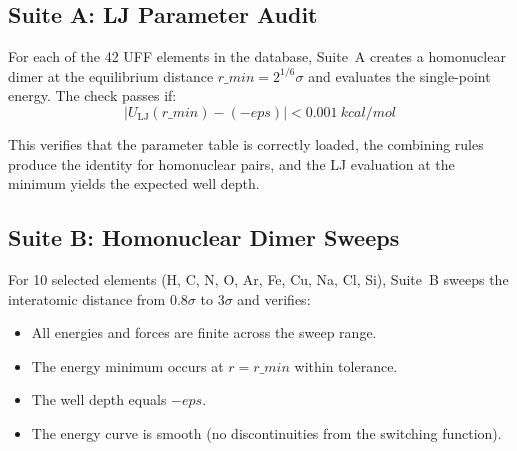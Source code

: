 \documentclass[11pt,twoside]{article}
\def\varepsilon{eps}%
\def\kcalmol{kcal/mol}%
\def\rmin{r\_min}%
\newcommand{\kcalmol}{\text{kcal/mol}}
\newcommand{\rmin}{r_{\mathrm{min}}}
\begin{document}
\subsection{Suite A: LJ Parameter Audit}

For each of the 42 UFF elements in the database, Suite~A creates a homonuclear dimer at the equilibrium distance $\rmin = 2^{1/6}\sigma$ and evaluates the single-point energy. The check passes if:
\begin{equation}
  |U_{\mathrm{LJ}}(\rmin) - (-\varepsilon)| < 0.001~\kcalmol
  \label{eq:suiteA}
\end{equation}

This verifies that the parameter table is correctly loaded, the combining rules produce the identity for homonuclear pairs, and the LJ evaluation at the minimum yields the expected well depth.

\subsection{Suite B: Homonuclear Dimer Sweeps}

For 10 selected elements (H, C, N, O, Ar, Fe, Cu, Na, Cl, Si), Suite~B sweeps the interatomic distance from $0.8\sigma$ to $3\sigma$ and verifies:

\begin{itemize}
  \item All energies and forces are finite across the sweep range.
  \item The energy minimum occurs at $r = \rmin$ within tolerance.
  \item The well depth equals $-\varepsilon$.
  \item The energy curve is smooth (no discontinuities from the switching function).
\end{itemize}
\end{document}
